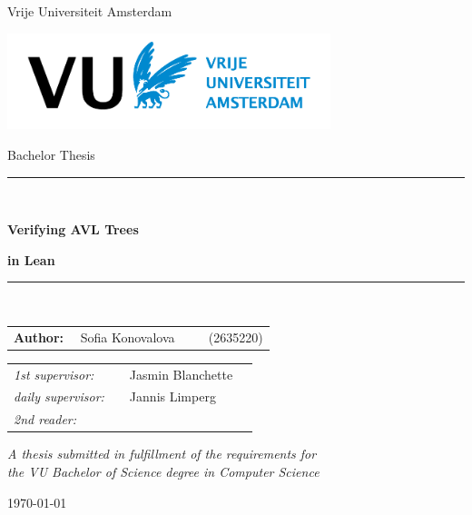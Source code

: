 \thispagestyle{empty}

\begin{center}

Vrije Universiteit Amsterdam

\vspace{1cm}

\includegraphics[height=28mm]{logo.png}

\vspace{1cm}

{\Large Bachelor Thesis}

\vspace*{1.5cm}

\rule{.9\linewidth}{.6pt}\\[0.4cm]
{\huge \bfseries Verifying AVL Trees\par}
{\huge \bfseries in Lean\par}\vspace{0.4cm}
\rule{.9\linewidth}{.6pt}\\[1.5cm]

\vspace*{2mm}

{\Large
\begin{tabular}{l}
{\bf Author:} ~~Sofia Konovalova ~~~~ (2635220)
\end{tabular}
}

\vspace*{1.5cm}

\begin{tabular}{ll}
{\it 1st supervisor:}   & ~~Jasmin Blanchette \\
{\it daily supervisor:} & ~~Jannis Limperg ~~~~ \\
{\it 2nd reader:}       & ~~
\end{tabular}

\vspace*{2cm}

\textit{A thesis submitted in fulfillment of the requirements for\\ the VU Bachelor of Science degree in Computer Science }

\vspace*{1cm}

\today\\[4cm] %

\end{center}